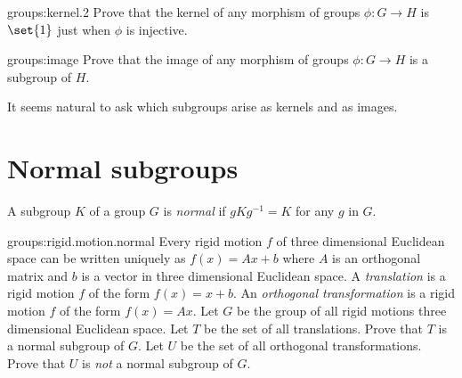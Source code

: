 \begin{problem}{groups:kernel.2}
Prove that the kernel of any morphism of groups \(\phi \colon G \to H\) is \(\set{1}\) just when \(\phi\) is injective.
\end{problem}

\begin{problem}{groups:image}
Prove that the image of any morphism of groups \(\phi \colon G \to H\) is a subgroup of \(H\).
\end{problem}

It seems natural to ask which subgroups arise as kernels and as images.


\section{Normal subgroups}
A subgroup \(K\) of a group \(G\) is \emph{normal} if \(gKg^{-1}=K\) for any \(g\) in \(G\).

\begin{problem}{groups:rigid.motion.normal}
Every rigid motion \(f\) of three dimensional Euclidean space can be written uniquely as \(f(x)=Ax+b\) where \(A\) is an orthogonal matrix and \(b\) is a vector in three dimensional Euclidean space.
A \emph{translation} is a rigid motion \(f\) of the form \(f(x)=x+b\).
An \emph{orthogonal transformation} is a rigid motion \(f\) of the form \(f(x)=Ax\).
Let \(G\) be the group of all rigid motions three dimensional Euclidean space.
Let \(T\) be the set of all translations.
Prove that \(T\) is a normal subgroup of \(G\).
Let \(U\) be the set of all orthogonal transformations.
Prove that \(U\) is \emph{not} a normal subgroup of \(G\).
\end{problem}

